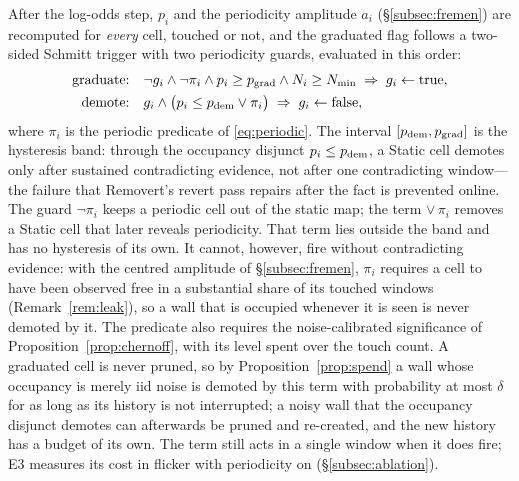 After the log-odds step, $p_i$ and the periodicity amplitude $a_i$ (\S\ref{subsec:fremen}) are recomputed for \emph{every} cell, touched or not, and the graduated flag follows a two-sided Schmitt trigger with two periodicity guards, evaluated in this order:
\begin{align}
  \text{graduate:}\quad & \lnot g_i\land\lnot\pi_i\land p_i\ge p_{\mathrm{grad}}\land N_i\ge N_{\min} \;\Rightarrow\; g_i\leftarrow\text{true},\label{eq:grad}\\
  \text{demote:}\quad & g_i\land\big(p_i\le p_{\mathrm{dem}}\lor\pi_i\big)\;\Rightarrow\; g_i\leftarrow\text{false},\label{eq:demote}
\end{align}
where $\pi_i$ is the periodic predicate of \eqref{eq:periodic}. The interval $[p_{\mathrm{dem}},p_{\mathrm{grad}}]$ is the hysteresis band: through the occupancy disjunct $p_i\le p_{\mathrm{dem}}$, a Static cell demotes only after sustained contradicting evidence, not after one contradicting window---the failure that Removert's revert pass repairs after the fact \citep{kim2020removert} is prevented online. The guard $\lnot\pi_i$ keeps a periodic cell out of the static map; the term $\lor\,\pi_i$ removes a Static cell that later reveals periodicity. That term lies outside the band and has no hysteresis of its own. It cannot, however, fire without contradicting evidence: with the centred amplitude of \S\ref{subsec:fremen}, $\pi_i$ requires a cell to have been observed free in a substantial share of its touched windows (Remark~\ref{rem:leak}), so a wall that is occupied whenever it is seen is never demoted by it. The predicate also requires the noise-calibrated significance of Proposition~\ref{prop:chernoff}, with its level spent over the touch count. A graduated cell is never pruned, so by Proposition~\ref{prop:spend} a wall whose occupancy is merely iid noise is demoted by this term with probability at most $\delta$ for as long as its history is not interrupted; a noisy wall that the occupancy disjunct demotes can afterwards be pruned and re-created, and the new history has a budget of its own. The term still acts in a single window when it does fire; E3 measures its cost in flicker with periodicity on (\S\ref{subsec:ablation}).

